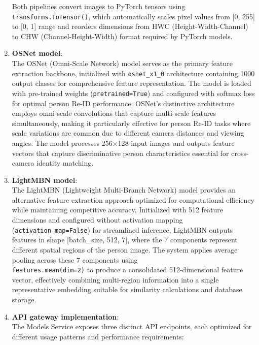 \begin{enumerate}
    Both pipelines convert images to PyTorch tensors using \\
    \texttt{transforms.ToTensor()}, which automatically scales pixel values from [0, 255] to [0, 1] range and reorders dimensions from HWC (Height-Width-Channel) to CHW (Channel-Height-Width) format required by PyTorch models.
    
    \item \textbf{OSNet model}:\\
    The OSNet (Omni-Scale Network) model serves as the primary feature extraction backbone, initialized with \texttt{osnet\_x1\_0} architecture containing 1000 output classes for comprehensive feature representation. The model is loaded with pre-trained weights (\texttt{pretrained=True}) and configured with softmax loss for optimal person Re-ID performance. OSNet's distinctive architecture employs omni-scale convolutions that capture multi-scale features simultaneously, making it particularly effective for person Re-ID tasks where scale variations are common due to different camera distances and viewing angles. The model processes 256×128 input images and outputs feature vectors that capture discriminative person characteristics essential for cross-camera identity matching.
    
    \item \textbf{LightMBN model}:\\
    The LightMBN (Lightweight Multi-Branch Network) model provides an alternative feature extraction approach optimized for computational efficiency while maintaining competitive accuracy. Initialized with 512 feature dimensions and configured without activation mapping (\texttt{activation\_map=False}) for streamlined inference, LightMBN outputs features in shape [batch\_size, 512, 7], where the 7 components represent different spatial regions of the person image. The system applies average pooling across these 7 components using \\ \texttt{features.mean(dim=2)} to produce a consolidated 512-dimensional feature vector, effectively combining multi-region information into a single representative embedding suitable for similarity calculations and database storage.
    
    \item \textbf{API gateway implementation}:\\
    The Models Service exposes three distinct API endpoints, each optimized for different usage patterns and performance requirements:
    

\end{enumerate}
